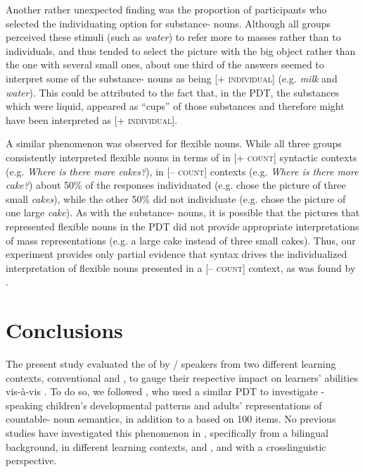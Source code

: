 \documentclass[output=paper]{langsci/langscibook}
\begin{document}
Another rather unexpected finding was the proportion of participants who selected the individuating option for substance- nouns. Although all groups perceived these stimuli (such as \textit{water}) to refer more to masses rather than to individuals, and thus tended to select the picture with the big object rather than the one with several small ones, about one third of the answers seemed to interpret some of the substance- nouns as being [+ \textsc{individual}] (e.g. \textit{milk} and \textit{water}). This could be attributed to the fact that, in the PDT, the  substances which were liquid, appeared as “cups” of those substances and therefore might have been interpreted as [\textsc{+ individual}].

\largerpage[-1]
A similar phenomenon was observed for flexible nouns. While all three groups consistently interpreted flexible nouns in terms of  in [\textsc{+ count}] syntactic contexts (e.g. \textit{Where is there more cakes?}), in [\textsc{– count}] contexts (e.g. \textit{Where is there more cake?}) about 50\% of the responses individuated (e.g. chose the picture of three small \textit{cakes}), while the other 50\% did not individuate (e.g. chose the picture of one large \textit{cake}). As with the substance- nouns, it is possible that the pictures that represented flexible nouns in the PDT did not provide appropriate interpretations of mass representations (e.g. a large cake instead of three small cakes). Thus, our experiment provides only partial evidence that syntax drives the individualized interpretation of flexible nouns presented in a [\textsc{– count}] context, as was found by \citet{BarnerSnedeker2005}.


\section{Conclusions}
\largerpage
The present study evaluated the  of  by / speakers from two different  learning contexts, conventional  and , to gauge their respective impact on learners’  abilities vis-à-vis . To do so, we followed \citet{BarnerSnedeker2005}, who used a similar PDT to investigate -speaking children’s developmental patterns and adults’ representations of countable- noun semantics, in addition to a  based on 100 items. No previous studies have investigated this phenomenon in , specifically from a bilingual background, in different learning contexts,  and , and with a crosslinguistic perspective. 
\end{document}
